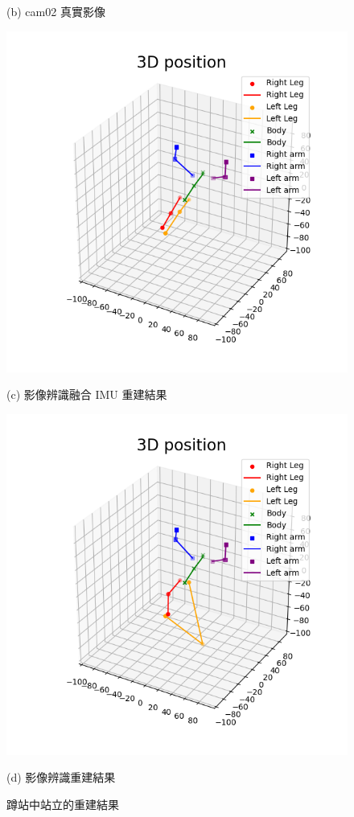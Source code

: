 \begin{figure}[!ht]
\begin{minipage}{.5\textwidth}
       \caption*{(b) cam02 真實影像}
    \end{minipage}
    \begin{minipage}{.5\textwidth}
       \centering
       \includegraphics[width=.95\linewidth]{figure/ch4_fig_bar_result_with1.png}
       \caption*{(c) 影像辨識融合 IMU 重建結果}
    \end{minipage}%
    \begin{minipage}{.5\textwidth}
       \centering
       \includegraphics[width=.95\linewidth]{figure/ch4_fig_bar_result_no1.png}
       \caption*{(d) 影像辨識重建結果}
    \end{minipage}
   \caption[蹲站中站立的重建結果]{蹲站中站立的重建結果}
   \label{ch4_fig_bar_stand}
\end{figure}

